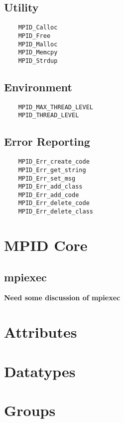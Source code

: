 \documentclass{article}
\begin{document}
\subsection{Utility}
\begin{verbatim}
    MPID_Calloc
    MPID_Free
    MPID_Malloc
    MPID_Memcpy
    MPID_Strdup
\end{verbatim}

\subsection{Environment}
\begin{verbatim}
    MPID_MAX_THREAD_LEVEL
    MPID_THREAD_LEVEL
\end{verbatim}

\subsection{Error Reporting}
\begin{verbatim}
    MPID_Err_create_code
    MPID_Err_get_string
    MPID_Err_set_msg
    MPID_Err_add_class
    MPID_Err_add_code
    MPID_Err_delete_code
    MPID_Err_delete_class
\end{verbatim}

\section{MPID Core}



\subsection{mpiexec}
\textbf{Need some discussion of mpiexec}

\section{Attributes}





\section{Datatypes}




\section{Groups}


\end{document}
